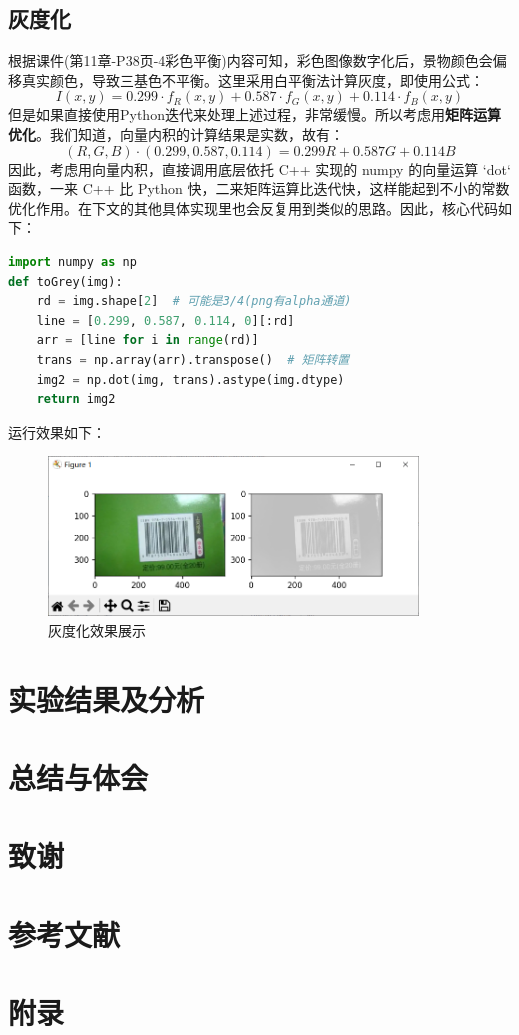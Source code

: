 \documentclass{ctexart}
\begin{document}
\subsection{灰度化}
根据课件(第11章-P38页-4彩色平衡)内容可知，彩色图像数字化后，景物颜色会偏移真实颜色，导致三基色不平衡。这里采用白平衡法计算灰度，即使用公式：%
\[I(x,y)=0.299\cdot f_R(x,y)+0.587\cdot f_G(x,y)+0.114\cdot f_B(x,y)\] %
但是如果直接使用Python迭代来处理上述过程，非常缓慢。所以考虑用\textbf{矩阵运算优化}。我们知道，向量内积的计算结果是实数，故有：
\[(R,G,B)\cdot(0.299,0.587,0.114)=0.299R+0.587G+0.114B\]
因此，考虑用向量内积，直接调用底层依托 C++ 实现的 numpy 的向量运算 `dot` 函数，一来 C++ 比 Python 快，二来矩阵运算比迭代快，这样能起到不小的常数优化作用。在下文的其他具体实现里也会反复用到类似的思路。因此，核心代码如下：
\begin{lstlisting}[language=python]
import numpy as np
def toGrey(img):
    rd = img.shape[2]  # 可能是3/4(png有alpha通道)
    line = [0.299, 0.587, 0.114, 0][:rd]
    arr = [line for i in range(rd)]
    trans = np.array(arr).transpose()  # 矩阵转置
    img2 = np.dot(img, trans).astype(img.dtype)
    return img2
\end{lstlisting}
运行效果如下：
\begin{figure}[htbp]
    \centering
    \includegraphics[height=120pt]{sample_toGrey}
    \caption{灰度化效果展示}
\end{figure}
\section{实验结果及分析}
\section{总结与体会}
\section{致谢}
\section{参考文献}
\section{附录}
\end{document}
